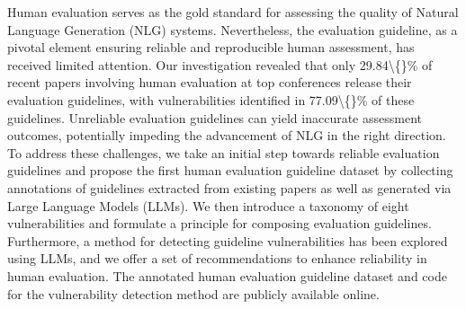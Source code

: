 Human evaluation serves as the gold standard for assessing the quality of Natural Language Generation (NLG) systems. Nevertheless, the evaluation guideline, as a pivotal element ensuring reliable and reproducible human assessment, has received limited attention. Our investigation revealed that only 29.84\textbackslash\{\}\% of recent papers involving human evaluation at top conferences release their evaluation guidelines, with vulnerabilities identified in 77.09\textbackslash\{\}\% of these guidelines. Unreliable evaluation guidelines can yield inaccurate assessment outcomes, potentially impeding the advancement of NLG in the right direction. To address these challenges, we take an initial step towards reliable evaluation guidelines and propose the first human evaluation guideline dataset by collecting annotations of guidelines extracted from existing papers as well as generated via Large Language Models (LLMs). We then introduce a taxonomy of eight vulnerabilities and formulate a principle for composing  evaluation guidelines. Furthermore, a method for detecting guideline vulnerabilities has been explored using LLMs, and we offer a set of recommendations to enhance reliability in human evaluation. The annotated human evaluation guideline dataset and code for the vulnerability detection method are publicly available online.